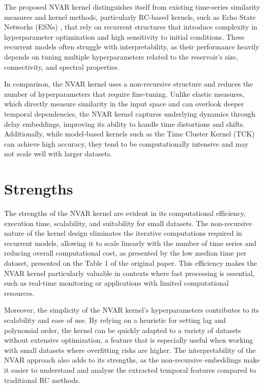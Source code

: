 The proposed NVAR kernel distinguishes itself from existing time-series similarity measures and kernel methods, particularly RC-based kernels, such as Echo State Networks (ESNs) \cite{jaeger2001}, that rely on recurrent structures that introduce complexity in hyperparameter optimization and high sensitivity to initial conditions. These recurrent models often struggle with interpretability, as their performance heavily depends on tuning multiple hyperparameters related to the reservoir's size, connectivity, and spectral properties.

In comparison, the NVAR kernel uses a non-recursive structure and reduces the number of hyperparameters that require fine-tuning. Unlike elastic measures, which directly measure similarity in the input space and can overlook deeper temporal dependencies, the NVAR kernel captures underlying dynamics through delay embeddings, improving its ability to handle time distortions and shifts. Additionally, while model-based kernels such as the Time Cluster Kernel (TCK) \cite{mikalsen2018} can achieve high accuracy, they tend to be computationally intensive and may not scale well with larger datasets.

\section{Strengths}

The strengths of the NVAR kernel are evident in its computational efficiency, execution time, scalability, and suitability for small datasets. The non-recursive nature of the kernel design eliminates the iterative computations required in recurrent models, allowing it to scale linearly with the number of time series and reducing overall computational cost, as presented by the low median time per dataset, presented on the Table 1 of the original paper. This efficiency makes the NVAR kernel particularly valuable in contexts where fast processing is essential, such as real-time monitoring or applications with limited computational resources.

Moreover, the simplicity of the NVAR kernel's hyperparameters contributes to its scalability and ease of use. By relying on a heuristic for setting lag and polynomial order, the kernel can be quickly adapted to a variety of datasets without extensive optimization, a feature that is especially useful when working with small datasets where overfitting risks are higher. The interpretability of the NVAR approach also adds to its strengths, as the non-recursive embeddings make it easier to understand and analyze the extracted temporal features compared to traditional RC methods.


